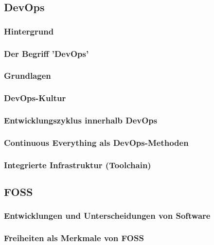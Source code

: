 \documentclass[12pt,titlepage]{article}
\begin{document}
\subsection{DevOps}


\subsubsection{Hintergrund}


\subsubsection{Der Begriff 'DevOps'}


\subsubsection{Grundlagen}


\subsubsection{DevOps-Kultur}


\subsubsection{Entwicklungszyklus innerhalb DevOps}


\subsubsection{Continuous Everything als DevOps-Methoden}


\subsubsection{Integrierte Infrastruktur (Toolchain)}


\subsection{FOSS}


\subsubsection{Entwicklungen und Unterscheidungen von Software}
\subsubsection{Freiheiten als Merkmale von FOSS}
\end{document}
